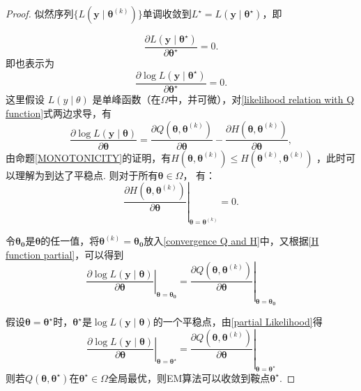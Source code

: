 \documentclass[UTF8,12pt]{ctexart}
\numberwithin{equation}{section}%
\begin{document}
	\begin{proof}
			似然序列$\{L(\mathbf{y}\mid \boldsymbol{\theta}^{(k)})\}$单调收敛到$L^{\star}=L(\mathbf{y}\mid \boldsymbol{\theta}^{\star})$，即
		
		$$
		\frac{\partial L(\mathbf{y}\mid \boldsymbol{\theta}^{\star})}{\partial \boldsymbol{\theta}^{\star}}=0 .
		$$	
		即也表示为
		$$
		\frac{\partial \log L(\mathbf{y}\mid \boldsymbol{\theta}^{\star})}{\partial \boldsymbol{\theta}^{\star}}=0 .
		$$
		这里假设 $L(y \mid \theta)$ 是单峰函数（在$\Omega$中，并可微），对\eqref{likelihood relation with Q function}式两边求导，有
		\begin{equation}\label{convergence Q and H}
			\frac{\partial \log L(\mathbf{y}\mid \boldsymbol{\theta})}{\partial\boldsymbol{\theta}}=\frac{\partial Q\left(\boldsymbol{\theta}, \boldsymbol{\theta}^{(k)}\right)}{\partial \boldsymbol{\theta}}-\frac{\partial H\left(\boldsymbol{\theta}, \boldsymbol{\theta}^{(k)}\right)}{\partial \boldsymbol{\theta}},
		\end{equation}
	由命题\ref{MONOTONICITY}的证明，有$H(\boldsymbol{\theta} , \boldsymbol{\theta}^{(k)})\le H(\boldsymbol{\theta}^{(k)}, \boldsymbol{\theta}^{(k)})$
	，此时可以理解为到达了平稳点. 则对于所有$\boldsymbol{\theta}\in\Omega$， 有：
	\begin{equation}\label{H function partial}
		\left.\frac{\partial H\left(\boldsymbol{\theta}, \boldsymbol{\theta}^{(k)}\right)}{\partial \boldsymbol{\theta}}\right|_{\boldsymbol{\theta}=\boldsymbol{\theta}^{(k)} }=0 .
	\end{equation}
	
	令$\boldsymbol{\theta_0}$是$\boldsymbol{\theta}$的任一值，将$\boldsymbol{\theta}^{(k)}=\boldsymbol{\theta_0}$放入\eqref{convergence Q and H}中，又根据\eqref{H function partial}，可以得到
	\begin{equation}\label{partial Likelihood}
		\left.\frac{\partial \log L(\mathbf{y} \mid \boldsymbol{\theta})}{\partial \boldsymbol{\theta}}\right|_{\boldsymbol{\theta}=\boldsymbol{\theta_0}}=
		\left.\frac{\partial Q\left(\boldsymbol{\theta}, \boldsymbol{\theta}^{(k)}\right)}{\partial \boldsymbol{\theta}}\right|_{\boldsymbol{\theta}=\boldsymbol{\theta_0}}
	\end{equation}
	
	假设$\boldsymbol{\theta}=\boldsymbol{\theta}^{\star}$时，$\boldsymbol{\theta}^{\star}$是$\log L(\mathbf{y} \mid \boldsymbol{\theta})$的一个平稳点，由\eqref{partial Likelihood}得
	\begin{equation}
		\left.\frac{\partial \log L(\mathbf{y} \mid \boldsymbol{\theta})}{\partial \boldsymbol{\theta}}\right|_{\boldsymbol{\theta}=\boldsymbol{\theta}^{\star}}=
		\left.\frac{\partial Q\left(\boldsymbol{\theta}, \boldsymbol{\theta}^{(k)}\right)}{\partial \boldsymbol{\theta}}\right|_{\boldsymbol{\theta}=\boldsymbol{\theta}^{\star}}
	\end{equation}
	则若$Q\left(\boldsymbol{\theta}, \boldsymbol{\theta}^{\star}\right)$在$\boldsymbol{\theta}^{\star}\in\Omega$全局最优，则EM算法可以收敛到鞍点$\boldsymbol{\theta}^{\star}$.
	\end{proof}
	
\end{document}
